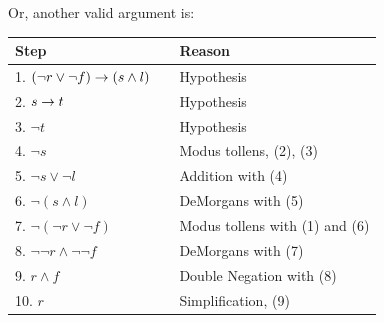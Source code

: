 \begin{questions}
\begin{solution}
    \newpage
    Or, another valid argument is:

    \begin{tabular}{lll}
        Step   & \hspace{0.2in}     & Reason \\
        \hline
        1. $(\neg r \vee \neg f) \rightarrow (s \wedge l)$                &   & Hypothesis \\
        2. $s \rightarrow t$                &   & Hypothesis \\
        3. $\neg t$  &   & Hypothesis \\
        4. $\neg s$                 &   & Modus tollens, (2), (3) \\
        5. $\neg s \vee \neg l$     &   & Addition with (4) \\
        6. $\neg(s \wedge l)$       &   & DeMorgans with (5) \\
        7. $\neg (\neg r \vee \neg f)$  & & Modus tollens with (1) and (6)\\
        8. $\neg \neg r \wedge \neg \neg f$ & & DeMorgans with (7) \\
        9. $r \wedge f$             &   & Double Negation with (8) \\
        10. $r$                     &   & Simplification, (9)
    \end{tabular}
\end{solution}





\end{questions}
